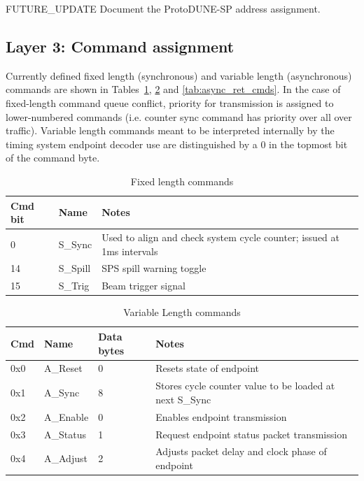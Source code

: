 \documentclass[a4paper,11pt]{article}
\begin{document}
{\color{red}FUTURE\_UPDATE} Document the ProtoDUNE-SP address assignment.

\subsection{Layer 3: Command assignment}

Currently defined fixed length (synchronous) and variable length (asynchronous) commands are shown in Tables~\ref{tab:sync_cmds}, \ref{tab:async_cmds} and \ref{tab:async_ret_cmds}. In the case of fixed-length command queue conflict, priority for transmission is assigned to lower-numbered commands (i.e. counter sync command has priority over all over traffic). Variable length commands meant to be interpreted internally by the timing system endpoint decoder use are distinguished by a 0 in the topmost bit of the command byte.

\begin{table}[h!]
  \centering
  \begin{tabular}{@{}llp{9cm}@{}} \toprule
    Cmd bit & Name & Notes\\ \midrule
    0 & S\_Sync & Used to align and check system cycle counter; issued at 1ms intervals \\
    14 & S\_Spill & SPS spill warning toggle \\
    15 & S\_Trig & Beam trigger signal \\ \bottomrule
  \end{tabular}
  \caption{Fixed length commands}
  \label{tab:sync_cmds}
\end{table}

\begin{table}[h!]
  \centering
  \begin{tabular}{@{}lllp{9cm}@{}} \toprule
    Cmd & Name & Data bytes & Notes\\ \midrule
    0x0 & A\_Reset & 0 & Resets state of endpoint \\
    0x1 & A\_Sync & 8 & Stores cycle counter value to be loaded at next S\_Sync \\
    0x2 & A\_Enable & 0 & Enables endpoint transmission \\
    0x3 & A\_Status & 1 & Request endpoint status packet transmission \\ 
    0x4 & A\_Adjust & 2 & Adjusts packet delay and clock phase of endpoint \\ \bottomrule
  \end{tabular}
  \caption{Variable Length commands}
  \label{tab:async_cmds}
\end{table}
\end{document}
